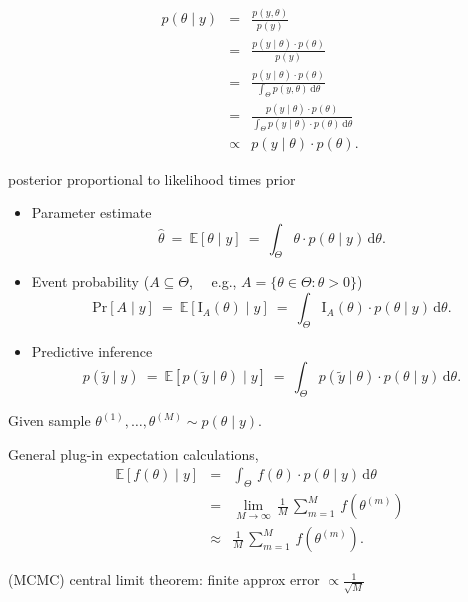 \documentclass[11pt]{report}
\begin{document}
{\footnotesize
\begin{eqnarray*}
p(\theta \mid y) & = & \frac{p(y, \theta)}{p(y)}
\\[4pt]
& = & \frac{p(y \mid \theta) \cdot p(\theta)}{p(y)}
\\[4pt]
& = & \frac{p(y \mid \theta) \cdot p(\theta)}{\int_{\Theta} p(y, \theta) \, \textrm{d}\theta}
\\[4pt]
& = & \frac{p(y \mid \theta) \cdot p(\theta)}{\int_{\Theta} p(y \mid \theta) \cdot p(\theta) \, \textrm{d}\theta}
\\[10pt]
& \propto &
p(y \mid \theta) \cdot p(\theta).
\end{eqnarray*}
\begin{subitemize}
\item posterior proportional to likelihood times prior
\end{subitemize}
}

\begin{itemize}
\item Parameter estimate
{\footnotesize $$
\hat{\theta}
\ = \ \mathbb{E}[\theta \mid y]
\ = \ \textstyle
\int_{\Theta} \theta \cdot p(\theta \mid y) \, \textrm{d}\theta.
$$}
\item Event probability ($A \subseteq \Theta$, \ \ {\footnotesize e.g., $A = \{ \theta \in \Theta : \theta > 0\}$})
{\footnotesize $$
\textrm{Pr}[A \mid y]
\ = \ \mathbb{E}[\textrm{I}_A(\theta) \mid y]
\ = \ \textstyle
\int_{\Theta} \textrm{I}_A(\theta) \cdot p(\theta \mid y)
\, \textrm{d}\theta.
$$}
\item Predictive inference
{\footnotesize $$
p(\tilde{y} \mid y)
\ = \ \mathbb{E}[p(\tilde{y} \mid \theta) \mid y]
\ = \ \textstyle
\int_{\Theta} p(\tilde{y} \mid \theta) \cdot p(\theta \mid y)
\, \textrm{d} \theta.
$$}
\end{itemize}

\begin{subitemize}
\item Given sample $\theta^{(1)}, \ldots, \theta^{(M)} \sim p(\theta \mid y).$
\item General plug-in expectation calculations,
\begin{eqnarray*}
\mathbb{E}[f(\theta) \mid y]
& = &
\int_{\Theta} \, f(\theta) \cdot p(\theta \mid y) \, \textrm{d}\theta
\\[8pt]
& = &
\lim_{M \rightarrow \infty} \,
\frac{1}{M} \, \sum_{m=1}^M \, f\!\left(\theta^{(m)}\right)
\\[8pt]
& \approx &
\frac{1}{M} \, \sum_{m=1}^M \, f\!\left(\theta^{(m)}\right).
\end{eqnarray*}
\item (MCMC) central limit theorem: finite approx error $\propto \frac{\displaystyle 1}{\displaystyle \sqrt{M}}$
\end{subitemize}
\end{document}
